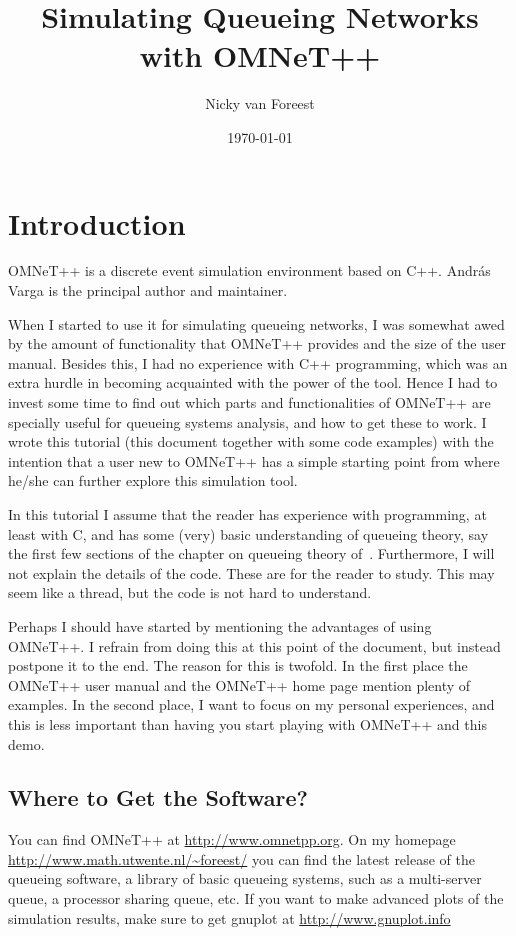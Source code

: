 \documentclass[a4paper]{article}
\date{\today}
\author{Nicky van Foreest}
\title{Simulating Queueing Networks with OMNeT++}
\begin{document}
\maketitle {}
\tableofcontents

\section{Introduction}
\label{sec:introduction}
OMNeT++ is a discrete event simulation environment based on C++. Andr{\'a}s
Varga is the principal author and maintainer.

When I started to use it for simulating queueing networks, I was
somewhat awed by the amount of functionality that OMNeT++ provides and
the size of the user manual. Besides this, I had no experience with
C++ programming, which was an extra hurdle in becoming acquainted with
the power of the tool. Hence I had to invest some time to find out
which parts and functionalities of OMNeT++ are specially useful for
queueing systems analysis, and how to get these to work. I wrote this
tutorial (this document together with some code examples) with the
intention that a  user new to OMNeT++ has a simple starting point from
where he/she can further explore this simulation tool.

In this tutorial I assume that the reader has experience with
programming, at least with C, and has some (very) basic understanding
of queueing theory, say the first few sections of the chapter on
queueing theory of~\cite{Ross93}.  Furthermore, I will not explain the
details of the code. These are for the reader to study. This may seem
like a thread, but the code is not hard to understand.

Perhaps I should have started by mentioning the advantages of using
OMNeT++. I refrain from doing this at this point of the document, but
instead postpone it to the end. The reason for this is twofold. In the
first place the OMNeT++ user manual and the OMNeT++ home page mention
plenty of examples. In the second place, I want to focus on my
personal experiences, and this is less important than having you start
playing with OMNeT++ and this demo.

\subsection{Where to Get the Software?}
\label{sec:where-get-software}
You can find OMNeT++ at \url{http://www.omnetpp.org}. On my homepage
\url{http://www.math.utwente.nl/~foreest/} you can find the latest
release of the queueing software, a library of basic queueing systems,
such as a multi-server queue, a processor sharing queue, etc.  If you
want to make advanced plots of the simulation results, make sure to
get gnuplot at \url{http://www.gnuplot.info}
\end{document}
